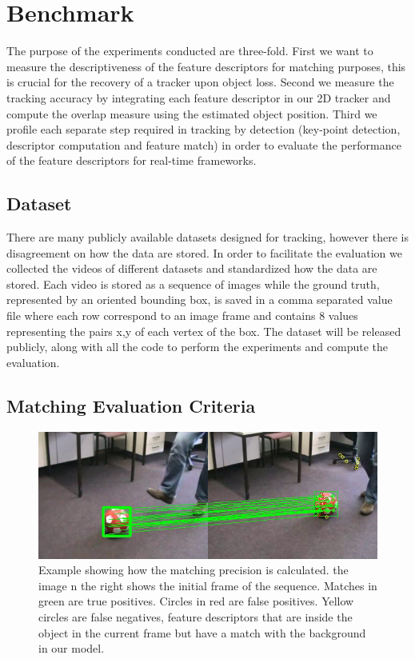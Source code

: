 \section{Benchmark}

The purpose of the experiments conducted are three-fold. First we want to measure the descriptiveness of the feature descriptors for matching purposes, this is crucial for the recovery of a tracker upon object loss. Second we measure the tracking accuracy by integrating each feature descriptor in our 2D tracker and compute the overlap measure using the estimated object position. Third we profile each separate step required in tracking by detection (key-point detection, descriptor computation and feature match) in order to evaluate the performance of the feature descriptors for real-time frameworks.

\subsection{Dataset}

There are many publicly available datasets designed for tracking, however there is disagreement on how the data are stored. In order to facilitate the evaluation we collected the videos of different datasets and standardized how the data are stored. Each video is stored as a sequence of images while the ground truth, represented by an oriented bounding box, is saved in a comma separated value file where each row correspond to an image frame and contains 8 values representing the pairs x,y of each vertex of the box. The dataset will be released publicly, along with all the code to perform the experiments and compute the evaluation.

\subsection{Matching Evaluation Criteria}

\begin{figure}
	\includegraphics[width=0.95\linewidth]{imgs/matching.png}
\vspace{-2.5mm}	
\caption{Example showing how the matching precision is calculated. the image n the right shows the initial frame of the sequence. Matches in green are true positives. Circles in red are false positives. Yellow circles are false negatives, feature descriptors that are inside the object in the current frame but have a match with the background in our model.}
\label{fig:matching}
\end{figure}


